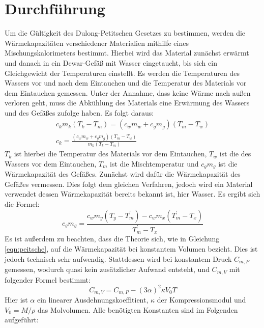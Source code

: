 \section{Durchführung}
\label{sec:Durchführung}
Um die Gültigkeit des Dulong-Petitschen Gesetzes zu bestimmen, werden die Wärmekapazitäten 
verschiedener Materialien
mithilfe eines Mischungskalorimeters bestimmt.
Hierbei wird das Material zunächst erwärmt und danach in ein Dewar-Gefäß mit Wasser eingetaucht,
bis sich ein Gleichgewicht der Temperaturen einstellt.
Es werden die Temperaturen des Wassers vor und nach dem Eintauchen und die Temperatur des Materials vor dem Eintauchen gemessen.
Unter der Annahme, dass keine Wärme nach außen verloren geht,
muss die Abkühlung des Materials eine Erwärmung des Wassers und des Gefäßes zufolge haben.
Es folgt daraus:
\begin{gather}
    c_km_k(T_k-T_m) = (c_wm_w + c_gm_g)(T_m - T_w) \\
    c_k = \frac{(c_wm_w + c_gm_g)(T_m - T_w)}{m_k(T_k - T_m)}
\end{gather}
$T_k$ ist hierbei die Temperatur des Materials vor dem Eintauchen, $T_w$ ist die des Wassers vor dem Eintauchen,
$T_m$ ist die Mischtemperatur und $c_gm_g$ ist die Wärmekapazität des Gefäßes.
Zunächst wird dafür die Wärmekapazität des Gefäßes vermessen. Dies folgt dem gleichen 
Verfahren, jedoch wird ein Material verwendet
dessen Wärmekapazität bereits bekannt ist, hier Wasser.
Es ergibt sich die Formel:
\begin{equation}
    \label{eqn:gefaess}
    c_gm_g = \frac{c_wm_y\left(T_y - T^{\prime}_m\right) - c_wm_x\left(T^{\prime}_m - T_x\right)}{T^{\prime}_m - T_x}
\end{equation}
Es ist außerdem zu beachten, dass die Theorie sich, wie in Gleichung \eqref{eqn:peitsche},
auf die Wärmekapazität bei konstantem Volumen bezieht.
Dies ist jedoch technisch sehr aufwendig. Stattdessen wird bei konstantem Druck $C_{m,P}$ gemessen,
wodurch quasi kein zusätzlicher Aufwand entsteht, und $C_{m,V}$ mit folgender Formel bestimmt:
\begin{equation}
    \label{eqn:konstv}
    C_{m,V} = C_{m,P} - (3\alpha)^2\kappa V_0T
\end{equation}
Hier ist $\alpha$ ein linearer Ausdehnungskoeffitient, $\kappa$ der Kompressionsmodul und \mbox{$V_0=M/\rho$} das Molvolumen.
Alle benötigten Konstanten sind im Folgenden aufgeführt:
